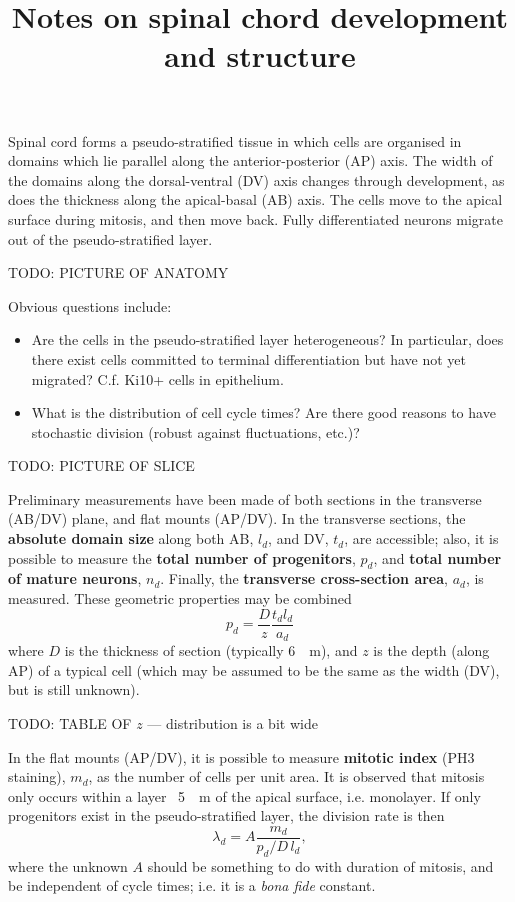 \documentclass[10pt,english]{article}
\begin{document}
\title{Notes on spinal chord development and structure}

\maketitle

Spinal cord forms a pseudo-stratified tissue in which cells are organised in domains which lie parallel along the anterior-posterior (AP) axis. The width of the domains along the dorsal-ventral (DV) axis changes through development, as does the thickness along the apical-basal (AB) axis. The cells move to the apical surface during mitosis, and then move back. Fully differentiated neurons migrate out of the pseudo-stratified layer.

TODO: PICTURE OF ANATOMY

Obvious questions include:

\begin{itemize}
\item Are the cells in the pseudo-stratified layer heterogeneous? In particular, does there exist cells committed to terminal differentiation but have not yet migrated? C.f. Ki10+ cells in epithelium.
\item What is the distribution of cell cycle times? Are there good reasons to have stochastic division (robust against fluctuations, etc.)?
\end{itemize}

TODO: PICTURE OF SLICE

Preliminary measurements have been made of both sections in the transverse (AB/DV) plane, and flat mounts (AP/DV). In the transverse sections, the \textbf{absolute domain size} along both AB, $l_d$, and DV, $t_d$, are accessible; also, it is possible to measure the \textbf{total number of progenitors}, $p_d$, and \textbf{total number of mature neurons}, $n_d$. Finally, the \textbf{transverse cross-section area}, $a_d$, is measured. These geometric properties may be combined $$p_d = \frac{D}{z} \frac{t_d l_d}{a_d}$$ where $D$ is the thickness of section (typically \SI{6}{\mu m}), and $z$ is the depth (along AP) of a typical cell (which may be assumed to be the same as the width (DV), but is still unknown).

TODO: TABLE OF $z$ --- distribution is a bit wide

In the flat mounts (AP/DV), it is possible to measure \textbf{mitotic index} (PH3 staining), $m_d$, as the number of cells per unit area. It is observed that mitosis only occurs within a layer ~\SI{5}{\mu m} of the apical surface, i.e. monolayer. If only progenitors exist in the pseudo-stratified layer, the division rate is then $$\lambda_d = A \frac{m_d}{p_d/D\,l_d},$$ where the unknown $A$ should be something to do with duration of mitosis, and be independent of cycle times; i.e. it is a \emph{bona fide} constant.
\end{document}
